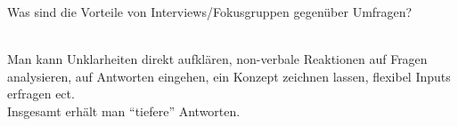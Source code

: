 \begin{exercise}
  Was sind die Vorteile von Interviews/Fokusgruppen gegenüber Umfragen?
  \\\\
\end{exercise}
Man kann Unklarheiten direkt aufklären, non-verbale Reaktionen auf Fragen analysieren,
auf Antworten eingehen,
ein Konzept zeichnen lassen, flexibel Inputs erfragen ect.\\
Insgesamt erhält man \enquote{tiefere} Antworten.